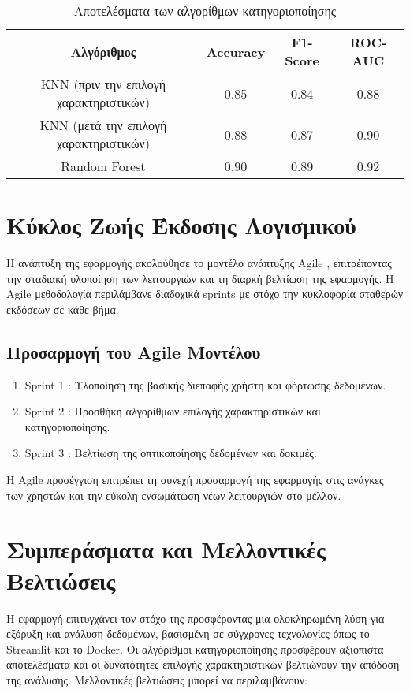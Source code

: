 \documentclass[a4paper,12pt]{article}
\begin{document}
\begin{table}[H]
\centering
\begin{tabular}{|c|c|c|c|}
\hline
Αλγόριθμος & \textlatin{Accuracy} & \textlatin{F1-Score} & \textlatin{ROC-AUC} \\
\hline
\textlatin{KNN} (πριν την επιλογή χαρακτηριστικών) & 0.85 & 0.84 & 0.88 \\
\textlatin{KNN} (μετά την επιλογή χαρακτηριστικών) & 0.88 & 0.87 & 0.90 \\
\textlatin{Random Forest} & 0.90 & 0.89 & 0.92 \\
\hline
\end{tabular}
\caption{Αποτελέσματα των αλγορίθμων κατηγοριοποίησης}
\end{table}

\section{Κύκλος Ζωής Έκδοσης Λογισμικού}

Η ανάπτυξη της εφαρμογής ακολούθησε το μοντέλο ανάπτυξης   \textlatin{Agile}  , επιτρέποντας την σταδιακή υλοποίηση των λειτουργιών και τη διαρκή βελτίωση της εφαρμογής. Η \textlatin{Agile} μεθοδολογία περιλάμβανε διαδοχικά \textlatin{sprints} με στόχο την κυκλοφορία σταθερών εκδόσεων σε κάθε βήμα.

\subsection{Προσαρμογή του \textlatin{Agile} Μοντέλου}
\begin{enumerate}
\item\textlatin{Sprint 1}  : Υλοποίηση της βασικής διεπαφής χρήστη και φόρτωσης δεδομένων.
\item\textlatin{Sprint 2}  : Προσθήκη αλγορίθμων επιλογής χαρακτηριστικών και κατηγοριοποίησης.
\item\textlatin{Sprint 3}  : Βελτίωση της οπτικοποίησης δεδομένων και δοκιμές.
\end{enumerate}

Η \textlatin{Agile} προσέγγιση επιτρέπει τη συνεχή προσαρμογή της εφαρμογής στις ανάγκες των χρηστών και την εύκολη ενσωμάτωση νέων λειτουργιών στο μέλλον.

\section{Συμπεράσματα και Μελλοντικές Βελτιώσεις}

Η εφαρμογή επιτυγχάνει τον στόχο της προσφέροντας μια ολοκληρωμένη λύση για εξόρυξη και ανάλυση δεδομένων, βασισμένη σε σύγχρονες τεχνολογίες όπως το \textlatin{Streamlit} και το \textlatin{Docker}. Οι αλγόριθμοι κατηγοριοποίησης προσφέρουν αξιόπιστα αποτελέσματα και οι δυνατότητες επιλογής χαρακτηριστικών βελτιώνουν την απόδοση της ανάλυσης. Μελλοντικές βελτιώσεις μπορεί να περιλαμβάνουν:
\end{document}
